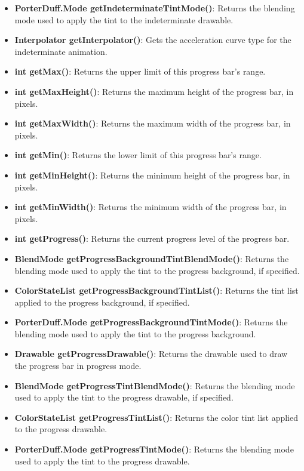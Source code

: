 \documentclass{report}
\begin{document}
\begin{itemize}
\begin{itemize}
                \item \textbf{PorterDuff.Mode getIndeterminateTintMode()}: Returns the blending mode used to apply the tint to the indeterminate drawable.
                \item \textbf{Interpolator getInterpolator()}: Gets the acceleration curve type for the indeterminate animation.
                \item \textbf{int getMax()}: Returns the upper limit of this progress bar's range.
                \item \textbf{int getMaxHeight()}: Returns the maximum height of the progress bar, in pixels.
                \item \textbf{int getMaxWidth()}: Returns the maximum width of the progress bar, in pixels.
                \item \textbf{int getMin()}: Returns the lower limit of this progress bar's range.
                \item \textbf{int getMinHeight()}: Returns the minimum height of the progress bar, in pixels.
                \item \textbf{int getMinWidth()}: Returns the minimum width of the progress bar, in pixels.
                \item \textbf{int getProgress()}: Returns the current progress level of the progress bar.
                \item \textbf{BlendMode getProgressBackgroundTintBlendMode()}: Returns the blending mode used to apply the tint to the progress background, if specified.
                \item \textbf{ColorStateList getProgressBackgroundTintList()}: Returns the tint list applied to the progress background, if specified.
                \item \textbf{PorterDuff.Mode getProgressBackgroundTintMode()}: Returns the blending mode used to apply the tint to the progress background.
                \item \textbf{Drawable getProgressDrawable()}: Returns the drawable used to draw the progress bar in progress mode.
                \item \textbf{BlendMode getProgressTintBlendMode()}: Returns the blending mode used to apply the tint to the progress drawable, if specified.
                \item \textbf{ColorStateList getProgressTintList()}: Returns the color tint list applied to the progress drawable.
                \item \textbf{PorterDuff.Mode getProgressTintMode()}: Returns the blending mode used to apply the tint to the progress drawable.

\end{itemize}
\end{itemize}
\end{document}
